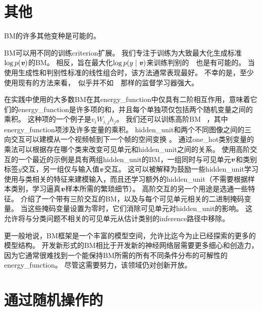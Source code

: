 
\section{其他}
\label{sec:other_boltzmann_machines}
\gls{BM}的许多其他变种是可能的。

\gls{BM}可以用不同的训练\gls{criterion}扩展。
我们专注于训练为大致最大化生成标准$\log p(\boldsymbol{\mathit{v}})$的\gls{BM}。
相反，旨在最大化$\log p(y \mid \boldsymbol{\mathit{v}})$来训练判别的~~也是有可能的\citep{Larochelle+Bengio-2008-small}。
当使用生成性和判别性标准的线性组合时，该方法通常表现最好。
不幸的是，至少使用现有的方法来看，~似乎并不如~~那样的监督学习器强大。

在实践中使用的大多数\gls{BM}在其\gls{energy_function}中仅具有二阶相互作用，意味着它们的\gls{energy_function}是许多项的和，并且每个单独项仅包括两个随机变量之间的乘积。
这种项的一个例子是$v_iW_{i,j}h_j$。
我们还可以训练高阶\gls{BM}~\citep{sejnowski1987higher} ，其中\gls{energy_function}项涉及许多变量的乘积。
\gls{hidden_unit}和两个不同图像之间的三向交互可以建模从一个视频帧到下一个帧的空间变换 \citep{Memisevic+Hinton-2007,Memisevic+Hinton-2010}。
通过\gls{one_hot}类别变量的乘法可以根据存在哪个类来改变可见单元和\gls{hidden_unit}之间的关系\citep{Nair2009}。
使用高阶交互的一个最近的示例是具有两组\gls{hidden_unit}的\gls{BM}，一组同时与可见单元$\boldsymbol{\mathit{v}}$和类别标签$y$交互，另一组仅与输入值$\boldsymbol{\mathit{v}}$交互\citep{luo2011learning}。 %
这可以被解释为鼓励一些\gls{hidden_unit}学习使用与类相关的特征来建模输入，而且还学习额外的\gls{hidden_unit}（不需要根据样本类别，学习逼真$\boldsymbol{\mathit{v}}$样本所需的繁琐细节）。
高阶交互的另一个用途是选通一些特征。
\citet{Sohn-et-al-ICML2013} 介绍了一个带有三阶交互的\gls{BM}，以及与每个可见单元相关的二进制掩码变量。
当这些掩码变量设置为零时，它们消除可见单元对\gls{hidden_unit}的影响。
这允许将与分类问题不相关的可见单元从估计类别的\gls{inference}路径中移除。

更一般地说，\gls{BM}框架是一个丰富的模型空间，允许比迄今为止已经探索的更多的模型结构。
开发新形式的\gls{BM}相比于开发新的神经网络层需要更多细心和创造力，因为它通常很难找到一个能保持\gls{BM}所需的所有不同条件分布的可解性的\gls{energy_function}。
尽管这需要努力，该领域仍对创新开放。


\section{通过随机操作的}
\label{sec:back_propagation_through_random_operations}


